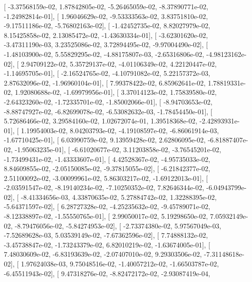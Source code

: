 \documentclass{article}
\begin{document}
       [ -3.37568159e-02,   1.87842805e-02,  -5.26465059e-02,
         -8.37890771e-02,  -1.24982814e-01],
       [  1.96046629e-02,  -9.53333563e-02,   3.83751810e-02,
         -9.17511186e-02,  -5.76802163e-02],
       [ -1.42452735e-02,   8.82027979e-02,   8.15425858e-02,
          2.13085472e-02,  -1.43630334e-01],
       [ -3.62301620e-02,  -3.47311190e-03,   3.23525086e-02,
          3.72894495e-02,  -9.97004490e-02],
       [ -1.48103900e-02,   5.55829295e-02,  -4.88175807e-03,
         -2.65316806e-02,  -4.98123162e-02],
       [  2.94709122e-02,   5.35729137e-02,  -4.01106349e-02,
          4.22120447e-02,  -1.14695705e-01],
       [ -2.16524765e-02,  -4.10791082e-02,   5.22157372e-03,
          2.87632096e-02,  -1.96960104e-01],
       [  7.99378422e-02,   6.85962641e-02,   1.78819331e-02,
          1.92080688e-02,  -1.69979956e-01],
       [  3.37014123e-02,   1.75839580e-02,  -2.64323260e-02,
         -1.72335701e-02,  -1.85002066e-01],
       [ -8.94703653e-02,  -8.88747927e-02,  -6.82699078e-02,
         -6.53082632e-03,  -1.78454450e-01],
       [  5.72686466e-02,   3.29584160e-02,   1.02672074e-01,
          1.39518368e-02,  -2.42893931e-01],
       [  1.19954003e-02,   8.04203793e-02,  -4.19108597e-02,
         -6.86061914e-03,  -1.67710425e-01],
       [  6.03990759e-02,   9.13959428e-02,   2.62806095e-02,
         -6.81887407e-02,  -1.95063235e-01],
       [ -6.61020677e-02,   3.11203858e-02,  -3.76545201e-02,
         -1.73499431e-02,  -1.43333607e-01],
       [  4.42528367e-02,  -4.95735033e-02,   8.84609855e-02,
         -2.05150085e-02,  -9.37815055e-02],
       [ -6.21842377e-02,   2.51100092e-02,  -3.00099961e-02,
          5.86303217e-02,  -1.69122013e-01],
       [ -2.03591547e-02,  -8.19140234e-02,  -7.10250352e-02,
          7.82646344e-02,  -6.04943799e-02],
       [ -8.41334656e-03,   4.33870635e-02,   5.27884742e-02,
          1.32288395e-02,  -5.64371597e-02],
       [  6.28727328e-02,  -4.25235632e-02,  -9.45789071e-02,
         -8.12338897e-02,  -1.55550765e-01],
       [  2.99050017e-02,   5.19298650e-02,   7.05932149e-02,
         -8.79476056e-02,  -5.84274953e-02],
       [ -2.73374380e-02,   5.97567049e-03,  -7.52689628e-03,
          5.03539149e-02,  -7.67362596e-02],
       [  7.74888132e-02,  -3.45738847e-02,  -1.73243379e-02,
          6.82010219e-02,  -1.63674005e-01],
       [  7.48030609e-02,  -6.83193639e-02,  -2.07407010e-02,
          9.29303506e-02,  -7.31148618e-02],
       [  1.97624038e-03,   9.75048516e-02,  -1.40057212e-02,
         -1.66503787e-02,  -6.45511943e-02],
       [  9.47318276e-02,  -8.82472172e-02,  -2.93087419e-04,
\end{document}
